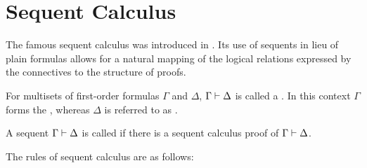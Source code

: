 \section{Sequent Calculus}
\label{sec:lk}

The famous sequent calculus was introduced in \cite{Gentzen}.
Its use of sequents in lieu of plain formulas allows for a natural mapping of the logical relations expressed by the connectives to the structure of proofs.

\begin{defi} 
	For multisets of first-order formulas $\Gamma$ and $\Delta$,  $\Gamma \vdash \Delta$ is called a . 
	In this context $\Gamma$ forms the , whereas $\Delta$ is referred to as .

	A sequent $\Gamma \vdash \Delta$ is called  if there is a sequent calculus proof of $\Gamma \vdash \Delta$.
\end{defi}

The rules of sequent calculus are as follows:

